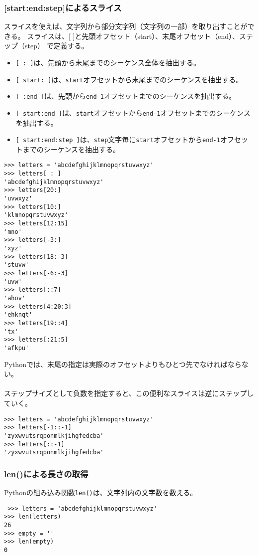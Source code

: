 \documentclass[11pt, oneside]{article}   	%
\begin{document}
\subsubsection{[start:end:step]によるスライス}
スライスを使えば、文字列から部分文字列（文字列の一部）を取り出すことができる。
スライスは、[ ]と先頭オフセット（start）、末尾オフセット（end）、ステップ（step）
で定義する。
\begin{itemize}
\item \verb|[ : ]|は、先頭から末尾までのシーケンス全体を抽出する。
\item \verb|[ start: ]|は、\verb|start|オフセットから末尾までのシーケンスを抽出する。
\item \verb|[ :end ]|は、先頭から\verb|end-1|オフセットまでのシーケンスを抽出する。
\item \verb|[ start:end ]|は、\verb|start|オフセットから\verb|end-1|オフセットまでのシーケンスを抽出する。
\item \verb|[ start:end:step ]|は、\verb|step|文字毎に\verb|start|オフセットから\verb|end-1|オフセットまでのシーケンスを抽出する。
\end{itemize}
\begin{lstlisting}
>>> letters = 'abcdefghijklmnopqrstuvwxyz'
>>> letters[ : ]
'abcdefghijklmnopqrstuvwxyz'
>>> letters[20:]
'uvwxyz'
>>> letters[10:]
'klmnopqrstuvwxyz'
>>> letters[12:15]
'mno'
>>> letters[-3:]
'xyz'
>>> letters[18:-3]
'stuvw'
>>> letters[-6:-3]
'uvw'
>>> letters[::7]
'ahov'
>>> letters[4:20:3]
'ehknqt'
>>> letters[19::4]
'tx'
>>> letters[:21:5]
'afkpu'
\end{lstlisting}
Pythonでは、末尾の指定は実際のオフセットよりもひとつ先でなければならない。\\
 \\
 ステップサイズとして負数を指定すると、この便利なスライスは逆にステップしていく。
 \begin{lstlisting}
>>> letters = 'abcdefghijklmnopqrstuvwxyz'
>>> letters[-1::-1]
'zyxwvutsrqponmlkjihgfedcba'
>>> letters[::-1]
'zyxwvutsrqponmlkjihgfedcba'
 \end{lstlisting}
 
 \subsubsection{len()による長さの取得}
 Pythonの組み込み関数\verb|len()|は、文字列内の文字数を数える。
 \begin{lstlisting}
 >>> letters = 'abcdefghijklmnopqrstuvwxyz'
>>> len(letters)
26
>>> empty = ''
>>> len(empty)
0
 \end{lstlisting}
 
\end{document}
